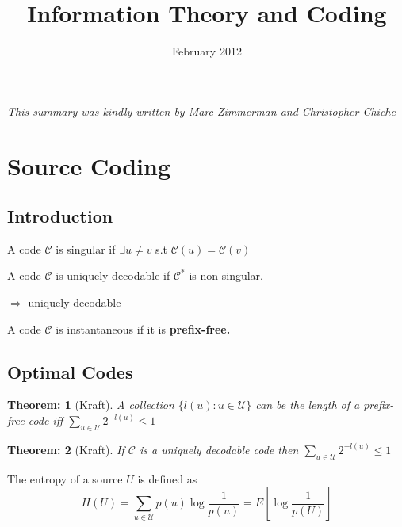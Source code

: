 \documentclass[11pt, a4paper]{scrartcl}
\newtheorem{theorem}{Theorem:}[section]
\newenvironment{definition}[1][Definition]{\begin{trivlist}
\item[\hskip \labelsep {\bfseries #1}]}{\end{trivlist}}
\newenvironment{remark}[1][Remark]{\begin{trivlist}
\item[\hskip \labelsep {\bfseries #1}]}{\end{trivlist}}
\begin{document}
\title{Information Theory and Coding}
\date{February 2012}
\maketitle
\emph{This summary was kindly written by Marc Zimmerman and Christopher Chiche}

\section{Source Coding}
\subsection{Introduction}

\begin{definition}[Singularity]
A code $\mathcal C$ is singular if $\exists u \neq v$ s.t $\mathcal C(u) = \mathcal C(v)$
\end{definition}

\begin{definition}[Uniquely decodable]
A code $\mathcal C$ is uniquely decodable if $\mathcal C^*$ is non-singular. 
\end{definition}

\begin{remark}[Prefix-free] $\Rightarrow$ uniquely decodable \end{remark}

\begin{definition}[Instantaneous code]
A code $\mathcal C$ is instantaneous if it is \bf{prefix-free}.
\end{definition}

\subsection{Optimal Codes}
\begin{theorem} [Kraft]
A collection $\{l(u): u\in \mathcal{U}\}$ can be the length of a
prefix-free code iff $\sum_{u\in\mathcal{U}} 2^{-l(u)}\leq 1$
\end{theorem}

\begin{theorem} [Kraft]
If $\mathcal{C}$ is a uniquely decodable code then
$\sum_{u\in\mathcal{U}} 2^{-l(u)}\leq 1$
\end{theorem}

\begin{definition} [Entropy] The entropy of a source $U$ is defined as
  $$H(U)=\sum_{u\in\mathcal{U}} p(u)\log \frac{1}{p(u)}=E\left[\log
  \frac{1}{p(U)}\right]$$
\end{definition}
\end{document}
